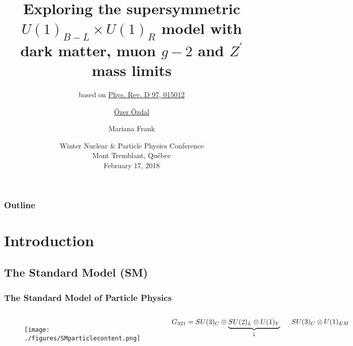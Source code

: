 \documentclass[hyperref={bookmarks=false},aspectratio=169]{beamer}
\title[]
{\bfseries{Exploring the  supersymmetric $U(1)_{B-L} \times U(1)_{R}$ model with dark matter, muon $g-2$ and $Z^\prime$ mass limits}}
\subtitle{{\small based on \hyperlink{https://journals.aps.org/prd/abstract/10.1103/PhysRevD.97.015012}{Phys. Rev. D 97, 015012}}}
\author[]
{\underline{Özer Özdal}\inst{1} \and Mariana Frank\inst{1}}
\institute[Concordia University]
{
    CONCORDIA UNIVERSITY\inst{1}
}
\date[WNPFC, 2018]
{Winter Nuclear \& Particle Physics Conference\\
	Mont Tremblant, Québec\\
	February 17, 2018}
\begin{document}
\frame{\titlepage}  %

\begin{frame}
\frametitle{Outline}
\tableofcontents
\end{frame}

\section{Introduction}
\subsection{The Standard Model (SM)}


\begin{frame}
\frametitle{The Standard Model of Particle Physics}

\begin{columns}
	
	
	\begin{figure}
		\centering
		\texttt{[image: ./figures/SMparticlecontent.png]}
	\end{figure}
	
	
	
	 {\small $G_{321} = SU(3)_C \tens \underbrace{SU(2)_L \tens U(1)_Y }_{\downarrow}   $}
	 
	 \pause
	 
	 \hspace{1.735cm} {\small $SU(3)_C \tens U(1)_{EM}$}
	 
\end{columns}


\end{frame}

\end{document}

